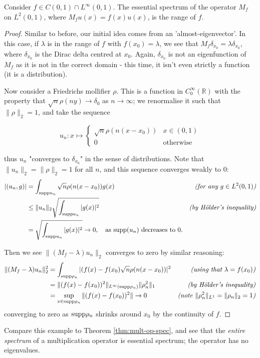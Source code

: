 \documentclass[../main.tex]{subfiles}
\begin{document}
\begin{example}
Consider $f \in C(0, 1) \cap L^\infty (0, 1)$. The essential spectrum of the operator $M_f$ on $L^2(0, 1)$, where $M_f u(x) = f(x)u(x)$, is the range of $f$.
\end{example}
\begin{proof}
Similar to before, our initial idea comes from an 'almost-eigenvector'. In this case, if $\lambda$ is in the range
of $f$ with $f(x_0) = \lambda$, we see that $M_f \delta_{x_0} = \lambda \delta_{x_0}$, where $\delta_{x_0}$ is the
Dirac delta centred at $x_0$. Again, $\delta_{x_0}$ is not an eigenfunction of $M_f$ as it is not in the correct domain - this time, 
it isn't even strictly a function (it is a distribution).

Now consider a Friedrichs mollifier $\rho$. This is a function in $C^\infty_0(\mathbb{R})$ with the property that $\sqrt{n}\rho(ny) \rightarrow \delta_0$ as $n \rightarrow \infty$; we renormalise it such that $\|\rho\|_2 = 1$, and take the sequence 

$$u_n: x \mapsto 
\begin{cases}
  \sqrt{n}\rho(n(x-x_0)) & x \in (0, 1) \\
  0 & \text{otherwise}
\end{cases}
$$

thus $u_n$ "converges to $\delta_{x_0}$" in the sense of distributions. Note that $\|u_n\|_2 = \|\rho\|_2 = 1$ for all $n$, and this sequence converges weakly to 0:
\begin{align*}
|( u_n, g )| & = \int_{\mathrm{supp}{u_n}}\sqrt{n}\rho(n(x-x_0))g(x) & \text{\emph{(for any $g \in L^2(0, 1)$)}} \\
& \leq \|u_n\|_2 \sqrt{\int_{\mathrm{supp}{u_n}} |g(x)|^2} & \text{\emph{(by H\"older's inequality)}} \\
& = \sqrt{\int_{\mathrm{supp}{u_n}} |g(x)|^2} \rightarrow 0, \quad \text{as $\mathrm{supp}(u_n)$ decreases to 0.} &
\end{align*}

Then we see $\|(M_f - \lambda)u_n\|_2$ converges to zero by similar reasoning:
\begin{align*}
\|(M_f - \lambda)u_n\|^2_2 & = \int_{\mathrm{supp} \rho_n} |(f(x) - f(x_0) \sqrt{n} \rho(n(x-x_0))|^2 & \text{\emph{(using that $\lambda = f(x_0)$)}} \\
& = \|(f(x) - f(x_0))^2\|_{L^\infty (\mathrm{supp} \rho_n)} \|\rho_n^2\|_1 & \text{\emph{(by H\"older's inequality)}} \\
& = \sup_{x \in \mathrm{supp} \rho_n} \|(f(x) - f(x_0))^2\| \rightarrow 0 & \text{\emph{(note $\|\rho_n^2\|_{L^1} = \|\rho_n\|_2 = 1$)}} \\
\end{align*}
converging to zero as $\mathrm{supp} \rho_n$ shrinks around $x_0$ by the continuity of $f$.
\end{proof}
Compare this example to Theorem \ref{thm:mult-op-spec}, and see that the \emph{entire spectrum} of a multiplication operator is essential spectrum; the
operator has no eigenvalues.
\end{document}
